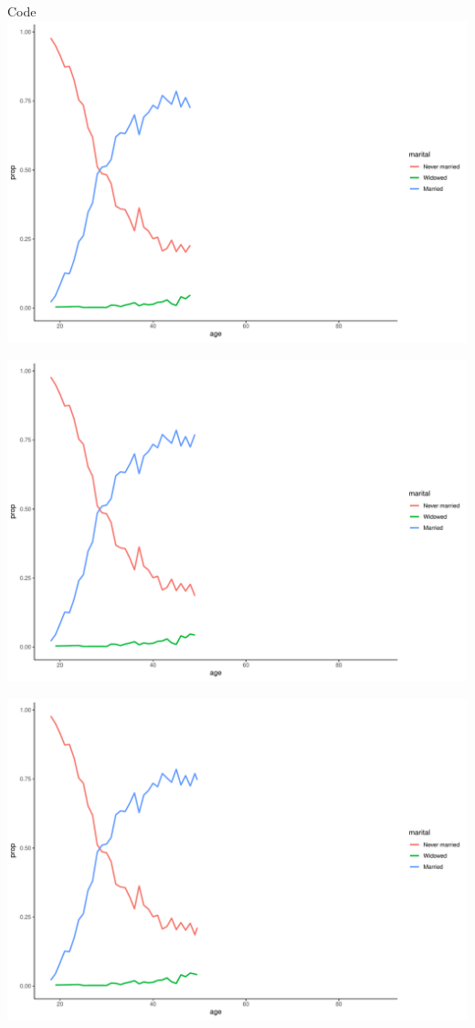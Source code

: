 \documentclass[
  ignorenonframetext,
]{beamer}
\begin{document}
\begin{frame}[fragile]{Code}
\includegraphics{gss_cat_files/figure-beamer/unnamed-chunk-1-47.pdf}

\includegraphics{gss_cat_files/figure-beamer/unnamed-chunk-1-48.pdf}

\includegraphics{gss_cat_files/figure-beamer/unnamed-chunk-1-49.pdf}


\end{frame}
\end{document}

